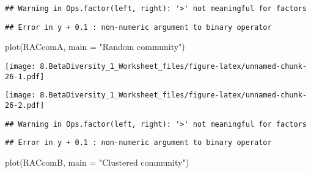 \documentclass[
]{article}
\newenvironment{Shaded}{\begin{snugshade}}{\end{snugshade}}
\newcommand{\AttributeTok}[1]{\textcolor[rgb]{0.77,0.63,0.00}{#1}}
\newcommand{\FunctionTok}[1]{\textcolor[rgb]{0.00,0.00,0.00}{#1}}
\newcommand{\NormalTok}[1]{#1}
\newcommand{\OtherTok}[1]{\textcolor[rgb]{0.56,0.35,0.01}{#1}}
\newcommand{\SpecialCharTok}[1]{\textcolor[rgb]{0.00,0.00,0.00}{#1}}
\newcommand{\StringTok}[1]{\textcolor[rgb]{0.31,0.60,0.02}{#1}}
\begin{document}
\begin{verbatim}
## Warning in Ops.factor(left, right): '>' not meaningful for factors
\end{verbatim}

\begin{verbatim}
## Error in y + 0.1 : non-numeric argument to binary operator
\end{verbatim}

\begin{Shaded}
\begin{Highlighting}[]
\FunctionTok{plot}\NormalTok{(RACcomA, }\AttributeTok{main =} \StringTok{"Random community"}\NormalTok{)}
\end{Highlighting}
\end{Shaded}

\texttt{[image: 8.BetaDiversity\_1\_Worksheet\_files/figure-latex/unnamed-chunk-26-1.pdf]}

\begin{Shaded}
\end{Shaded}

\texttt{[image: 8.BetaDiversity\_1\_Worksheet\_files/figure-latex/unnamed-chunk-26-2.pdf]}

\begin{Shaded}
\end{Shaded}

\begin{verbatim}
## Warning in Ops.factor(left, right): '>' not meaningful for factors
\end{verbatim}

\begin{verbatim}
## Error in y + 0.1 : non-numeric argument to binary operator
\end{verbatim}

\begin{Shaded}
\begin{Highlighting}[]
\FunctionTok{plot}\NormalTok{(RACcomB, }\AttributeTok{main =} \StringTok{"Clustered community"}\NormalTok{)}
\end{Highlighting}
\end{Shaded}
\end{document}
